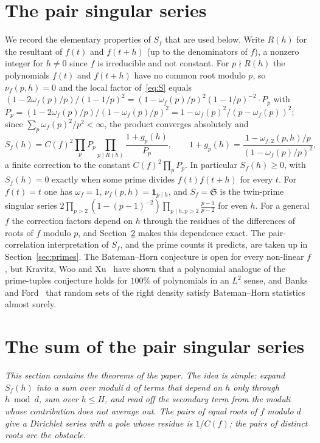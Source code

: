 \documentclass[11pt,a4paper]{article}
\theoremstyle{remark}\newtheorem{remark}[theorem]{Remark}
\newcommand{\Sig}{\mathfrak S}
\begin{document}
\section{The pair singular series}\label{sec:pair}

We record the elementary properties of $S_f$ that are used below. Write $R(h)$ for the resultant of $f(t)$
and $f(t+h)$ (up to the denominators of $f$), a nonzero integer for $h\ne0$ since $f$ is irreducible and
not constant. For $p\nmid R(h)$ the polynomials $f(t)$ and $f(t+h)$ have no common root modulo $p$, so
$\nu_f(p,h)=0$ and the local factor of~\eqref{eq:S} equals $(1-2\omega_f(p)/p)/(1-1/p)^2=(1-\omega_f(p)/p)^2(1-1/p)^{-2}\cdot P_p$
with $P_p=(1-2\omega_f(p)/p)/(1-\omega_f(p)/p)^2=1-\omega_f(p)^2/(p-\omega_f(p))^2$; since
$\sum_p\omega_f(p)^2/p^2<\infty$, the product converges absolutely and
\[
S_f(h)=C(f)^2\prod_pP_p\prod_{p\mid R(h)}\frac{1+g_p(h)}{P_p},\qquad
1+g_p(h)=\frac{1-\omega_{f,2}(p,h)/p}{(1-\omega_f(p)/p)^2},
\]
a finite correction to the constant $C(f)^2\prod_pP_p$. In particular $S_f(h)\ge0$, with $S_f(h)=0$
exactly when some prime divides $f(t)f(t+h)$ for every $t$. For $f(t)=t$ one has $\omega_f=1$,
$\nu_f(p,h)=\mathbf 1_{p\mid h}$, and $S_f=\Sig$ is the twin-prime singular series
$2\prod_{p>2}(1-(p-1)^{-2})\prod_{p\mid h,p>2}\frac{p-1}{p-2}$ for even $h$. For a general $f$ the
correction factors depend on $h$ through the residues of the differences of roots of $f$ modulo $p$, and
Section~\ref{sec:sum} makes this dependence exact. The pair-correlation interpretation of $S_f$, and the
prime counts it predicts, are taken up in Section~\ref{sec:primes}. The Bateman--Horn conjecture is
open for every non-linear $f$, but Kravitz, Woo and Xu~\cite{KravitzWooXu2025} have shown that a
polynomial analogue of the prime-tuples conjecture holds for $100\%$ of polynomials in an $L^2$ sense,
and Banks and Ford~\cite{BanksFord2026} that random sets of the right density satisfy Bateman--Horn
statistics almost surely.

\section{The sum of the pair singular series}\label{sec:sum}

\emph{This section contains the theorems of the paper. The idea is simple: expand $S_f(h)$ into a sum
over moduli $d$ of terms that depend on $h$ only through $h\bmod d$, sum over $h\le H$, and read off the
secondary term from the moduli whose contribution does not average out. The pairs of equal roots of $f$
modulo $d$ give a Dirichlet series with a pole whose residue is $1/C(f)$; the pairs of distinct roots
are the obstacle.}
\end{document}
